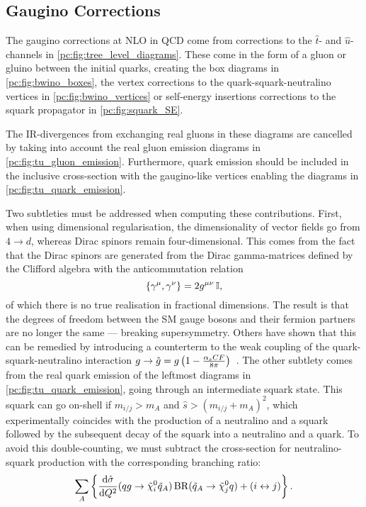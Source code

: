\documentclass[../main.tex]{subfiles}
\begin{document}
\subsection{Gaugino Corrections}
The gaugino corrections at NLO in QCD come from corrections to the \(\hat{t}\)- and \(\hat{u}\)-channels in \cref{pc:fig:tree_level_diagrams}.
These come in the form of a gluon or gluino between the initial quarks, creating the box diagrams in \cref{pc:fig:bwino_boxes}, the vertex corrections to the quark-squark-neutralino vertices in \cref{pc:fig:bwino_vertices} or self-energy insertions corrections to the squark propagator in \cref{pc:fig:squark_SE}.

The IR-divergences from exchanging real gluons in these diagrams are cancelled by taking into account the real gluon emission diagrams in \cref{pc:fig:tu_gluon_emission}. Furthermore, quark emission should be included in the inclusive cross-section with the gaugino-like vertices enabling the diagrams in \cref{pc:fig:tu_quark_emission}.
\medskip

Two subtleties must be addressed when computing these contributions.
First, when using dimensional regularisation, the dimensionality of vector fields go from \(4 \to d\), whereas Dirac spinors remain four-dimensional.
This comes from the fact that the Dirac spinors are generated from the Dirac gamma-matrices defined by the Clifford algebra with the anticommutation relation
\begin{equation}
  \cclosed{\gamma\^\mu, \gamma\^\nu} = 2\g \eye,
\end{equation}
of which there is no true realisation in fractional dimensions.
The result is that the degrees of freedom between the SM gauge bosons and their fermion partners are no longer the same --- breaking supersymmetry.
Others have shown that this can be remedied by introducing a counterterm to the weak coupling of the quark-squark-neutralino interaction \(g \to \hat{g} = g\pclosed{1 - \frac{\alpha_s CF}{8\pi}}\)~\cite{Aguilar-Saavedra:2005zyz}.
The other subtlety comes from the real quark emission of the leftmost diagrams in \cref{pc:fig:tu_quark_emission}, going through an intermediate squark state.
This squark can go on-shell if \(m_{i/j} > m_A\) and \(\hat{s} > (m_{i/j} + m_A)^2\), which experimentally coincides with the production of a neutralino and a squark followed by the subsequent decay of the squark into a neutralino and a quark.
To avoid this double-counting, we must subtract the cross-section for neutralino-squark production with the corresponding branching ratio:
\begin{equation}
  \sum_A \cclosed{\d[Q^2]{\hat\sigma}(qg \to \tilde\chi^0_i \tilde{q}_A) \operatorname{BR}(\tilde{q}_A \to \tilde\chi^0_j q) + (i \leftrightarrow j)}.
\end{equation}
\end{document}
